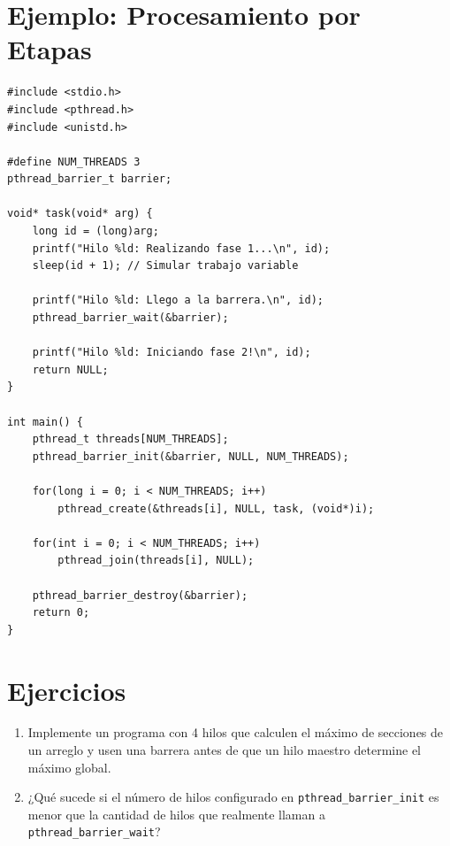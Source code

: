 \documentclass[12pt,a4paper]{article}
\begin{document}
\section{Ejemplo: Procesamiento por Etapas}
\begin{lstlisting}
#include <stdio.h>
#include <pthread.h>
#include <unistd.h>

#define NUM_THREADS 3
pthread_barrier_t barrier;

void* task(void* arg) {
    long id = (long)arg;
    printf("Hilo %ld: Realizando fase 1...\n", id);
    sleep(id + 1); // Simular trabajo variable

    printf("Hilo %ld: Llego a la barrera.\n", id);
    pthread_barrier_wait(&barrier);

    printf("Hilo %ld: Iniciando fase 2!\n", id);
    return NULL;
}

int main() {
    pthread_t threads[NUM_THREADS];
    pthread_barrier_init(&barrier, NULL, NUM_THREADS);

    for(long i = 0; i < NUM_THREADS; i++)
        pthread_create(&threads[i], NULL, task, (void*)i);

    for(int i = 0; i < NUM_THREADS; i++)
        pthread_join(threads[i], NULL);

    pthread_barrier_destroy(&barrier);
    return 0;
}
\end{lstlisting}

\section{Ejercicios}
\begin{enumerate}
    \item Implemente un programa con 4 hilos que calculen el máximo de secciones de un arreglo y usen una barrera antes de que un hilo maestro determine el máximo global.
    \item ¿Qué sucede si el número de hilos configurado en \texttt{pthread\_barrier\_init} es menor que la cantidad de hilos que realmente llaman a \texttt{pthread\_barrier\_wait}?
\end{enumerate}
\end{document}
